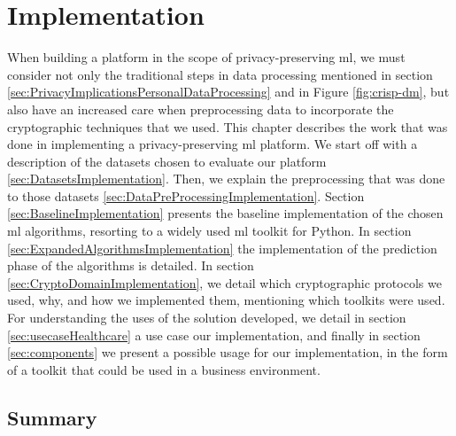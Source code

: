 %

\acresetall

\chapter{Implementation}
\label{ch:Implementation}

When building a platform in the scope of privacy-preserving \ac{ml}, we must consider not only the traditional steps in data processing mentioned in section \ref{sec:PrivacyImplicationsPersonalDataProcessing} and in Figure \ref{fig:crisp-dm}, but also have an increased care when preprocessing data to incorporate the cryptographic techniques that we used.
This chapter describes the work that was done in implementing a privacy-preserving \ac{ml} platform. We start off with a description of the datasets chosen to evaluate our platform \ref{sec:DatasetsImplementation}. Then, we explain the preprocessing that was done to those datasets \ref{sec:DataPreProcessingImplementation}.
Section \ref{sec:BaselineImplementation} presents the baseline implementation of the chosen \ac{ml} algorithms, resorting to a widely used \ac{ml} toolkit for Python.
In section \ref{sec:ExpandedAlgorithmsImplementation} the implementation of the prediction phase of the algorithms is detailed.
In section \ref{sec:CryptoDomainImplementation}, we detail which cryptographic protocols we used, why, and how we implemented them, mentioning which toolkits were used.
For understanding the uses of the solution developed, we detail in section \ref{sec:usecaseHealthcare} a use case our implementation, and finally in section \ref{sec:components} we present a possible usage for our implementation, in the form of a toolkit that could be used in a business environment.










  
\section{Summary}
\label{sec:SummaryImplementation}



